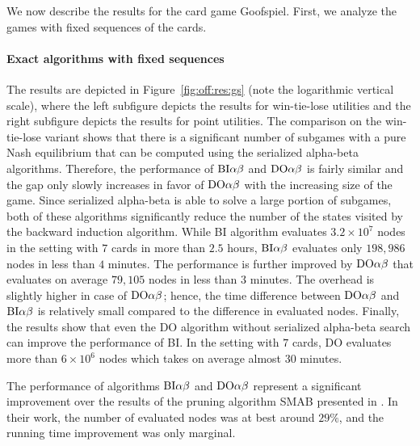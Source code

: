 We now describe the results for the card game Goofspiel.
First, we analyze the games with fixed sequences of the cards.

\paragraph{Exact algorithms with fixed sequences}
The results are depicted in Figure~\ref{fig:off:res:gs} (note the logarithmic vertical scale), where the left subfigure depicts the results for win-tie-lose utilities and the right subfigure depicts the results for point utilities.
The comparison on the win-tie-lose variant shows that there is a significant number of subgames with a pure Nash equilibrium that can be computed using the serialized alpha-beta algorithms.
Therefore, the performance of $\textrm{BI}\alpha\beta$ and $\textrm{DO}\alpha\beta$ is fairly similar and the gap only slowly increases in favor of $\textrm{DO}\alpha\beta$ with the increasing size of the game.
Since serialized alpha-beta is able to solve a large portion of subgames, both of these algorithms significantly reduce the number of the states visited by the backward induction algorithm.
While \textsc{BI} algorithm evaluates $3.2\times10^7$ nodes in the setting with $7$ cards in more than $2.5$ hours, $\textrm{BI}\alpha\beta$ evaluates only $198,986$ nodes in less than $4$ minutes.
The performance is further improved by $\textrm{DO}\alpha\beta$ that evaluates on average $79,105$ nodes in less than $3$ minutes.
The overhead is slightly higher in case of $\textrm{DO}\alpha\beta$; hence, the time difference between $\textrm{DO}\alpha\beta$ and $\textrm{BI}\alpha\beta$ is relatively small compared to the difference in evaluated nodes.
Finally, the results show that even the \textsc{DO} algorithm without serialized alpha-beta search can improve the performance of \textsc{BI}.
In the setting with $7$ cards, \textsc{DO} evaluates more than $6\times10^6$ nodes which takes on average almost 30 minutes.


The performance of algorithms $\textrm{BI}\alpha\beta$ and $\textrm{DO}\alpha\beta$ represent a significant improvement over the results of the pruning algorithm
SMAB presented in \cite{Saffidine12SMAB}.
In their work, the number of evaluated nodes was at best around $29\%$, and the running time improvement was only marginal.

